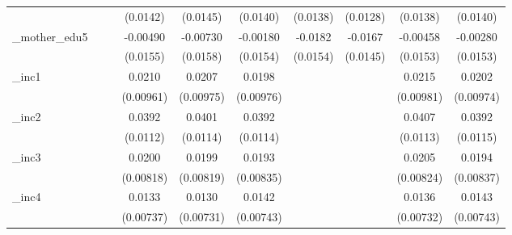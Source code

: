 \begin{table}[htbp]
\begin{tabular}{l*{9}{c}}
            &                     &                     &    (0.0142)         &    (0.0145)         &    (0.0140)         &    (0.0138)         &    (0.0128)         &    (0.0138)         &    (0.0140)         \\
[1em]
\_mother\_edu5&                     &                     &    -0.00490         &    -0.00730         &    -0.00180         &     -0.0182         &     -0.0167         &    -0.00458         &    -0.00280         \\
            &                     &                     &    (0.0155)         &    (0.0158)         &    (0.0154)         &    (0.0154)         &    (0.0145)         &    (0.0153)         &    (0.0153)         \\
[1em]
\_inc1       &                     &                     &      0.0210\sym{**} &      0.0207\sym{**} &      0.0198\sym{**} &                     &                     &      0.0215\sym{**} &      0.0202\sym{**} \\
            &                     &                     &   (0.00961)         &   (0.00975)         &   (0.00976)         &                     &                     &   (0.00981)         &   (0.00974)         \\
[1em]
\_inc2       &                     &                     &      0.0392\sym{***}&      0.0401\sym{***}&      0.0392\sym{***}&                     &                     &      0.0407\sym{***}&      0.0392\sym{***}\\
            &                     &                     &    (0.0112)         &    (0.0114)         &    (0.0114)         &                     &                     &    (0.0113)         &    (0.0115)         \\
[1em]
\_inc3       &                     &                     &      0.0200\sym{**} &      0.0199\sym{**} &      0.0193\sym{**} &                     &                     &      0.0205\sym{**} &      0.0194\sym{**} \\
            &                     &                     &   (0.00818)         &   (0.00819)         &   (0.00835)         &                     &                     &   (0.00824)         &   (0.00837)         \\
[1em]
\_inc4       &                     &                     &      0.0133\sym{*}  &      0.0130\sym{*}  &      0.0142\sym{*}  &                     &                     &      0.0136\sym{*}  &      0.0143\sym{*}  \\
            &                     &                     &   (0.00737)         &   (0.00731)         &   (0.00743)         &                     &                     &   (0.00732)         &   (0.00743)         \\

\end{tabular}
\end{table}
